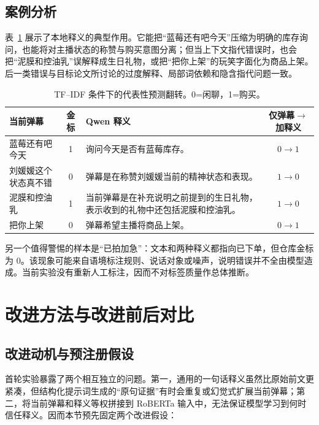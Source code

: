 \documentclass[UTF8,zihao=-4,a4paper]{ctexart}
\begin{document}
\FloatBarrier

\subsection{案例分析}

表~\ref{tab:cases} 展示了本地释义的典型作用。它能把“蓝莓还有吧今天”压缩为明确的库存询问，也能将对主播状态的称赞与购买意图分离；但当上下文指代错误时，也会把“泥膜和控油乳”误解释成生日礼物，或把“把你上架”的玩笑字面化为商品上架。后一类错误与目标论文所讨论的过度解释、局部词依赖和隐含指代问题一致\cite{zhu2026bc4rii}。

\begin{table}[htbp]
\centering
\caption{TF--IDF 条件下的代表性预测翻转。0=闲聊，1=购买。}
\label{tab:cases}
\small
\begin{tabularx}{\textwidth}{p{2.4cm}cXc}
\toprule
当前弹幕 & 金标 & Qwen 释义 & 仅弹幕$\rightarrow$加释义 \\
\midrule
蓝莓还有吧今天 & 1 & 询问今天是否有蓝莓库存。 & $0\rightarrow1$ \\
刘媛媛这个状态真不错 & 0 & 弹幕是在称赞刘媛媛当前的精神状态和表现。 & $1\rightarrow0$ \\
泥膜和控油乳 & 1 & 当前弹幕是在补充说明之前提到的生日礼物，表示收到的礼物中还包括泥膜和控油乳。 & $1\rightarrow0$ \\
把你上架 & 0 & 弹幕希望主播将商品上架。 & $0\rightarrow1$ \\
\bottomrule
\end{tabularx}
\end{table}

另一个值得警惕的样本是“已拍加急”：文本和两种释义都指向已下单，但仓库金标为 0。该现象可能来自语境标注规则、说话对象或噪声，说明错误并不全由模型造成。当前实验没有重新人工标注，因而不对标签质量作总体推断。

\section{改进方法与改进前后对比}

\subsection{改进动机与预注册假设}

首轮实验暴露了两个相互独立的问题。第一，通用的一句话释义虽然比原始前文更紧凑，但结构化提示词生成的“原句证据”有时会重复或幻觉式扩展当前弹幕；第二，将当前弹幕和释义等权拼接到 RoBERTa 输入中，无法保证模型学习到何时信任释义。因而本节预先固定两个改进假设：
\end{document}
